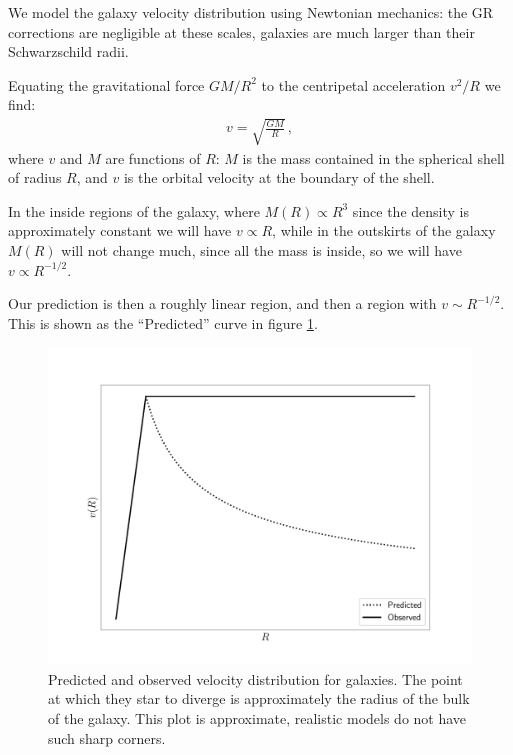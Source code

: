 \documentclass[main.tex]{subfiles}
\begin{document}
We model the galaxy velocity distribution using Newtonian mechanics: the GR corrections are negligible at these scales, galaxies are much larger than their Schwarzschild radii.

Equating the gravitational force \(GM/R^2\) to the centripetal acceleration \(v^2 /R\) we find: 
%
\begin{align}
v = \sqrt{\frac{GM}{R}}
\,,
\end{align}
%
where \(v\) and \(M\) are functions of \(R\): \(M\) is the mass contained in the spherical shell of radius \(R\), and \(v\) is the orbital velocity at the boundary of the shell.

In the inside regions of the galaxy, where \(M(R) \propto R^3\) since the density is approximately constant we will have \(v \propto R\), while in the outskirts of the galaxy \(M(R)\) will not change much, since all the mass is inside, so we will have \(v \propto R^{-1/2}\).

Our prediction is then a roughly linear region, and then a region with \(v \sim R^{-1/2}\).
This is shown as the ``Predicted'' curve in figure \ref{fig:dark_matter}.

\begin{figure}[ht]
\centering
\includegraphics[width=\textwidth]{figures/Dark_matter.pdf}
\caption{Predicted and observed velocity distribution for galaxies. The point at which they star to diverge is approximately the radius of the bulk of the galaxy. This plot is approximate, realistic models do not have such sharp corners.}
\label{fig:dark_matter}
\end{figure}  
\end{document}
